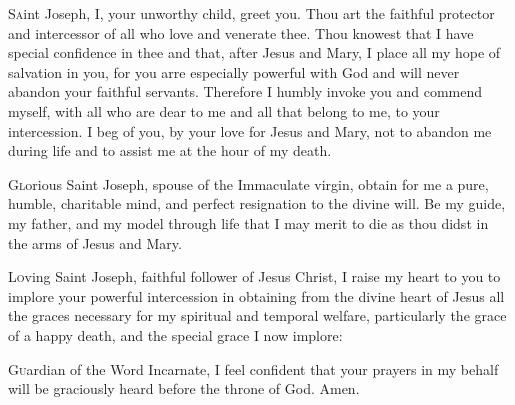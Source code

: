 {\centering\Large{\MakeUppercase{}}\par}

\begin{enpars}
\lettrine{S}{a}int Joseph, I, your unworthy child, greet you. Thou art the faithful protector and intercessor of all who love and venerate thee. Thou knowest that I have special confidence in thee and that, after Jesus and Mary, I place all my hope of salvation in you, for you arre especially powerful with God and will never abandon your faithful servants. Therefore I humbly invoke you and commend myself, with all who are dear to me and all that belong to me, to your intercession. I beg of you, by your love for Jesus and Mary, not to abandon me during life and to assist me at the hour of my death.

\lettrine{G}{l}orious Saint Joseph, spouse of the Immaculate virgin, obtain for me a pure, humble, charitable mind, and perfect resignation to the divine will. Be my guide, my father, and my model through life that I may merit to die as thou didst in the arms of Jesus and Mary.

\lettrine{L}{o}ving Saint Joseph, faithful follower of Jesus Christ, I raise my heart to you to implore your powerful intercession in obtaining from the divine heart of Jesus all the graces necessary for my spiritual and temporal welfare, particularly the grace of a happy death, and the special grace I now implore:


\lettrine{G}{u}ardian of the Word Incarnate, I feel confident that your prayers in my behalf will be graciously heard before the throne of God. Amen.
\end{enpars}